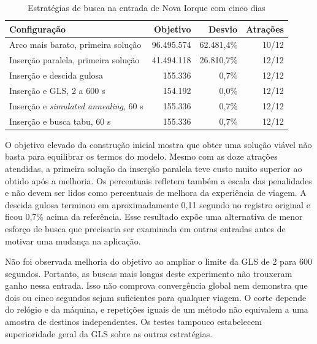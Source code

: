 \begin{table}[H]
\centering
\small
\caption{Estratégias de busca na entrada de Nova Iorque com cinco dias}
\label{tab:comparacao-busca}
\begin{tabularx}{\textwidth}{>{\raggedright\arraybackslash}Xrrr}
\hline
\textbf{Configuração} & \textbf{Objetivo} & \textbf{Desvio} & \textbf{Atrações} \\
\hline
Arco mais barato, primeira solução & 96.495.574 & 62.481,4\% & 10/12 \\
Inserção paralela, primeira solução & 41.494.118 & 26.810,7\% & 12/12 \\
Inserção e descida gulosa & 155.336 & 0,7\% & 12/12 \\
Inserção e GLS, 2 a 600 s & 154.192 & 0,0\% & 12/12 \\
Inserção e \textit{simulated annealing}, 60 s & 155.336 & 0,7\% & 12/12 \\
Inserção e busca tabu, 60 s & 155.336 & 0,7\% & 12/12 \\
\hline
\end{tabularx}
\end{table}

O objetivo elevado da construção inicial mostra que obter uma solução viável não basta para equilibrar os termos do modelo. Mesmo com as doze atrações atendidas, a primeira solução da inserção paralela teve custo muito superior ao obtido após a melhoria. Os percentuais refletem também a escala das penalidades e não devem ser lidos como percentuais de melhora da experiência de viagem. A descida gulosa terminou em aproximadamente 0,11 segundo no registro original e ficou 0,7\% acima da referência. Esse resultado expõe uma alternativa de menor esforço de busca que precisaria ser examinada em outras entradas antes de motivar uma mudança na aplicação.

Não foi observada melhoria do objetivo ao ampliar o limite da GLS de 2 para 600 segundos. Portanto, as buscas mais longas deste experimento não trouxeram ganho nessa entrada. Isso não comprova convergência global nem demonstra que dois ou cinco segundos sejam suficientes para qualquer viagem. O corte depende do relógio e da máquina, e repetições iguais de um método não equivalem a uma amostra de destinos independentes. Os testes tampouco estabelecem superioridade geral da GLS sobre as outras estratégias.


